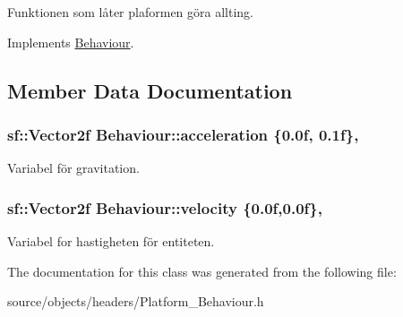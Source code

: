 Funktionen som låter plaformen göra allting. 



Implements \hyperlink{classBehaviour_aaa6b4ee24dc3cc546fa4dbb7ba4d20da}{Behaviour}.



\subsection{Member Data Documentation}
\hypertarget{classBehaviour_ac17cf81ceee6a44e8a8ec6ee810c9fd3}{
\subsubsection[{acceleration}]{\setlength{\rightskip}{0pt plus 5cm}sf\+::\+Vector2f Behaviour\+::acceleration \{0.\+0f, 0.\+1f\}\hspace{0.3cm}{\ttfamily [protected]}, {\ttfamily [inherited]}}}\label{classBehaviour_ac17cf81ceee6a44e8a8ec6ee810c9fd3}


Variabel för gravitation. 

\hypertarget{classBehaviour_a1d52096cf20a59890f7705acbaccf88a}{
\subsubsection[{velocity}]{\setlength{\rightskip}{0pt plus 5cm}sf\+::\+Vector2f Behaviour\+::velocity \{0.\+0f,0.\+0f\}\hspace{0.3cm}{\ttfamily [protected]}, {\ttfamily [inherited]}}}\label{classBehaviour_a1d52096cf20a59890f7705acbaccf88a}


Variabel for hastigheten för entiteten. 



The documentation for this class was generated from the following file\+:\begin{DoxyCompactItemize}
\item 
source/objects/headers/Platform\+\_\+\+Behaviour.\+h\end{DoxyCompactItemize}
